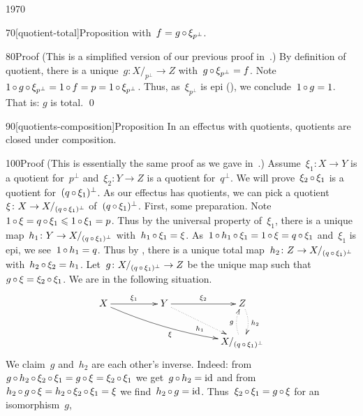 \begin{parsec}{1970}
\begin{point}{70}[quotient-total]{Proposition}
    with~$f = g \mathop{\circ} \xi_{p^\perp}$.
\begin{point}{80}{Proof}%
(This is a simplified version of our previous
    proof in~\cite{effintro}.)
By definition of quotient, there is a unique~$g\colon X/_{p^\perp} \to Z$
    with~$g \mathop{\circ} \xi_{p^\perp} = f$.
Note~$1 \mathop{\circ} g \mathop{\circ} \xi_{p^\perp} = 1 \mathop{\circ} f = p = 1 \mathop{\circ} \xi_{p^\perp}$.
Thus, as~$\xi_{p^\perp}$ is epi (),
    we conclude~$1 \mathop{\circ} g = 1$.
That is: $g$ is total. \qed
\end{point}
\end{point}
\begin{point}{90}[quotients-composition]{Proposition}%
In an effectus with quotients,
    quotients are closed under composition.
\begin{point}{100}{Proof}%
(This is essentially the same proof as we gave in~\cite{effintro}.)
Assume~$\xi_1\colon X \to Y$ is a quotient for~$p^\perp$
    and~$\xi_2\colon Y \to Z$ is a quotient for~$q^\perp$.
We will prove~$\xi_2 \mathop{\circ} \xi_1$
    is a quotient for~$(q \mathop{\circ} \xi_1)^\perp$.
As our effectus has quotients,
    we can pick a quotient~$\xi \colon X \to X/_{(q \mathop{\circ} \xi_1)^\perp}$
        of~$(q \mathop{\circ} \xi_1)^\perp$.
First, some preparation.
Note~$1 \mathop{\circ} \xi = q \mathop{\circ} \xi_1 \leqslant 1 \mathop{\circ} \xi_1 = p$.
Thus by the universal property of~$\xi_1$,
there is a unique map~$h_1\colon Y \to X/_{(q \mathop{\circ} \xi_1)^\perp}$
        with~$h_1 \mathop{\circ} \xi_1 = \xi$.
As~$1 \mathop{\circ} h_1 \mathop{\circ} \xi_1 = 1 \mathop{\circ} \xi = q \mathop{\circ} \xi_1$
    and~$\xi_1$ is epi, we see~$1 \mathop{\circ} h_1 = q$.
Thus by ,
there is a unique total map~$h_2 \colon Z \to X/_{(q \mathop{\circ} \xi_1)^\perp}$
    with~$h_2 \mathop{\circ} \xi_2 = h_1$.
Let~$g\colon X/_{(q \mathop{\circ} \xi_1)^\perp} \to Z$
    be the unique map such that~$g \mathop{\circ} \xi = \xi_2 \mathop{\circ} \xi_1$.
We are in the following situation.
\begin{equation*}
    \xymatrix@C+2pc{
        X  \ar[r]^{\xi_1} \ar@/_/[rrd]_{\xi}
        & Y \ar[r]^{\xi_2} \ar@{.>}[rd]_{h_1}
        & Z \ar@{.>}@/^/[d]^{h_2} \\
        && X/_{(q \after \xi_1)^\perp} \ar@{.>}@/^/[u]^{g}
    }
\end{equation*}
We claim~$g$ and~$h_2$ are each other's inverse.
Indeed: from $g \mathop{\circ} h_2 \mathop{\circ} \xi_2 \mathop{\circ} \xi_1= g \mathop{\circ} \xi = \xi_2 \mathop{\circ} \xi_1$
    we get~$g \mathop{\circ} h_2 = \mathrm{id}$
    and from~$h_2 \mathop{\circ} g \mathop{\circ} \xi = h_2 \mathop{\circ} \xi_2 \mathop{\circ} \xi_1 = \xi$
    we find~$h_2 \mathop{\circ} g = \mathrm{id}$.
Thus~$\xi_2 \mathop{\circ} \xi_1 = g \mathop{\circ} \xi$ for an isomorphism~$g$,

\end{point}
\end{point}
\end{parsec}

